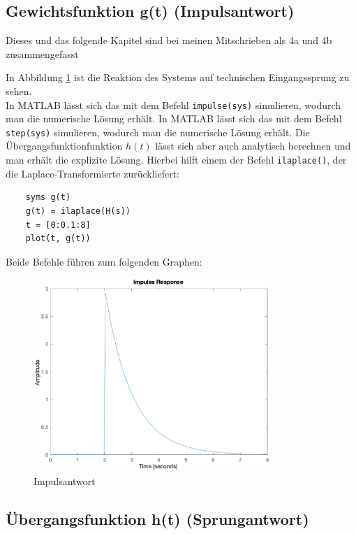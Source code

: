 \subsection{Gewichtsfunktion g(t) (Impulsantwort)}
Dieses und das folgende Kapitel sind bei meinen Mitschrieben als 4a und 4b zusammengefasst


In Abbildung \ref{fig:impuls} ist die Reaktion des Systems auf technischen Eingangssprung zu sehen.
\\
In MATLAB lässt sich das mit dem Befehl \texttt{impulse(sys)} simulieren, wodurch man die numerische Lösung erhält. In MATLAB lässt sich das mit dem Befehl \texttt{step(sys)} simulieren, wodurch man die numerische Lösung erhält. Die Übergangsfunktionfunktion $h(t)$ lässt sich aber auch analytisch berechnen und man erhält die explizite Lösung. Hierbei hilft einem der Befehl \texttt{ilaplace()}, der die Laplace-Transformierte zurückliefert:
\begin{lstlisting}
    syms g(t)
    g(t) = ilaplace(H(s))
    t = [0:0.1:8]
    plot(t, g(t))
\end{lstlisting}

Beide Befehle führen zum folgenden Graphen:



\begin{figure}[H]
    \label{fig:impuls}
    \centering
    \includegraphics[width=0.8\textwidth]{Bilder/ImpulsAntwortPT1Tt.eps}
    \caption{Impulsantwort}
 \end{figure}

\subsection{Übergangsfunktion h(t) (Sprungantwort)}

